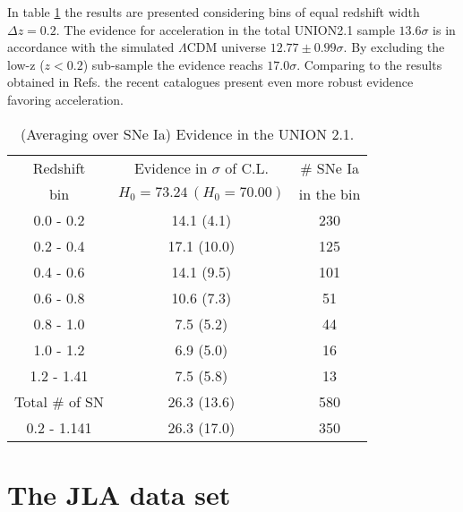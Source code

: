 \documentclass[nofootinbib,twocolumn]{revtex4}
\begin{document}

In table \ref{TableAveUNION} the results are presented considering bins of equal redshift width $\Delta z = 0.2$. The evidence for acceleration in the total UNION2.1 sample $13.6 \sigma$ is in accordance with the simulated $\Lambda$CDM universe $12.77 \pm 0.99 \sigma$. By excluding the low-z ($z<0.2$) sub-sample the evidence reachs $17.0 \sigma$. Comparing to the results obtained in Refs. \cite{Seikel:2007pk,Seikel:2008ms} the recent catalogues present even more robust evidence favoring acceleration.


\begin{table}
\centering\caption{(Averaging over SNe Ia) Evidence in the UNION 2.1.  }
{\begin{tabular} {c||c||c}
Redshift & Evidence  in $\sigma$ of C.L. & \# SNe Ia \\
bin & $H_0=73.24 \, (H_0=70.00)$& in the bin \\
\hline \hline
0.0 - 0.2 & 14.1 (4.1) & 230 \\
0.2 - 0.4 & 17.1 (10.0) & 125 \\
0.4 - 0.6 & 14.1 (9.5)& 101  \\
0.6 - 0.8 & 10.6 (7.3) & 51  \\
0.8 - 1.0 & 7.5 (5.2) & 44  \\
1.0 - 1.2 & 6.9 (5.0) & 16  \\
1.2 - 1.41 & 7.5 (5.8) & 13  \\
Total \# of SN & 26.3 (13.6) & 580  \\
0.2 - 1.141 & 26.3 (17.0) & 350  \\
\hline
\end{tabular}} 
\label{TableAveUNION}
\end{table}




\section{The JLA data set}
\end{document}
